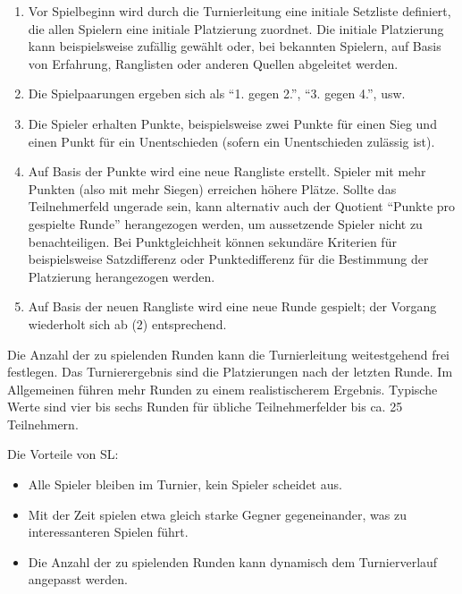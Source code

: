 \documentclass[DIV=15, 10pt]{scrartcl}
\begin{document}
\begin{enumerate}

\item Vor Spielbeginn wird durch die Turnierleitung eine initiale Setzliste definiert, die allen Spielern eine initiale Platzierung zuordnet. Die initiale Platzierung kann beispielsweise zufällig gewählt oder, bei bekannten Spielern, auf Basis von Erfahrung, Ranglisten oder anderen Quellen abgeleitet werden.

\item Die Spielpaarungen ergeben sich als "`1. gegen 2."', "`3. gegen 4."', usw.

\item Die Spieler erhalten Punkte, beispielsweise zwei Punkte für einen Sieg und einen Punkt für ein Unentschieden (sofern ein Unentschieden zulässig ist).

\item Auf Basis der Punkte wird eine neue Rangliste erstellt. Spieler mit mehr Punkten (also mit mehr Siegen) erreichen höhere Plätze. Sollte das Teilnehmerfeld ungerade sein, kann alternativ auch der Quotient "`Punkte pro gespielte Runde"' herangezogen werden, um aussetzende Spieler nicht zu benachteiligen. Bei Punktgleichheit können sekundäre Kriterien für beispielsweise Satzdifferenz oder Punktedifferenz für die Bestimmung der Platzierung herangezogen werden.

\item Auf Basis der neuen Rangliste wird eine neue Runde gespielt; der Vorgang wiederholt sich ab (2) entsprechend.

\end{enumerate}

Die Anzahl der zu spielenden Runden kann die Turnierleitung weitestgehend frei festlegen. Das Turnierergebnis sind die Platzierungen nach der letzten Runde. Im Allgemeinen führen mehr Runden zu einem realistischerem Ergebnis. Typische Werte sind vier bis sechs Runden für übliche Teilnehmerfelder bis ca. 25 Teilnehmern.

Die Vorteile von SL:

\begin{itemize}

\item Alle Spieler bleiben im Turnier, kein Spieler scheidet aus.

\item Mit der Zeit spielen etwa gleich starke Gegner gegeneinander, was zu interessanteren Spielen führt.

\item Die Anzahl der zu spielenden Runden kann dynamisch dem Turnierverlauf angepasst werden.

\end{itemize}
\end{document}
